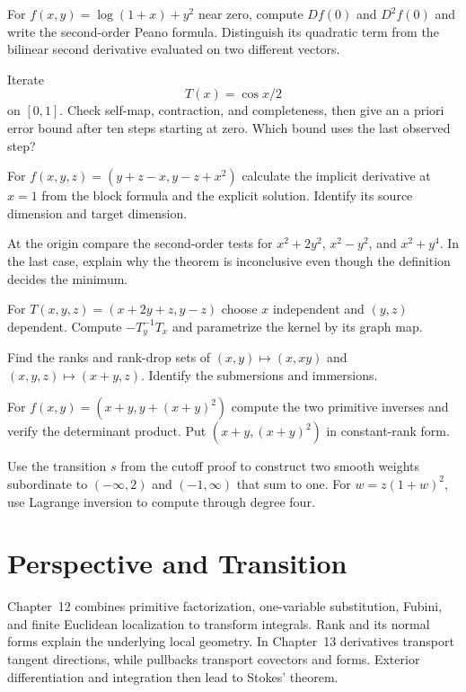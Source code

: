\begin{exercise}
For $f(x,y)=\log(1+x)+y^2$ near zero, compute $Df(0)$ and $D^2f(0)$ and write
the second-order Peano formula. Distinguish its quadratic term from the
bilinear second derivative evaluated on two different vectors.
\end{exercise}
\begin{exercise}
Iterate
\[
T(x)=\cos x/2
\]
 on $[0,1]$. Check self-map, contraction,
and completeness, then give an a priori error bound after ten steps
starting at zero. Which bound uses the last observed step?
\end{exercise}
\begin{exercise}
For $f(x,y,z)=(y+z-x,y-z+x^2)$ calculate the implicit derivative at
$x=1$ from the block formula and the explicit solution. Identify its
source dimension and target dimension.
\end{exercise}
\begin{exercise}
At the origin compare the second-order tests for $x^2+2y^2$,
$x^2-y^2$, and $x^2+y^4$. In the last case, explain why the theorem
is inconclusive even though the definition decides the minimum.
\end{exercise}

\begin{exercise}
For $T(x,y,z)=(x+2y+z,y-z)$ choose $x$ independent and $(y,z)$ dependent.
Compute $-T_y^{-1}T_x$ and parametrize the kernel by its graph map.
\end{exercise}
\begin{exercise}
Find the ranks and rank-drop sets of $(x,y)\mapsto(x,xy)$ and
$(x,y,z)\mapsto(x+y,z)$. Identify the submersions and immersions.
\end{exercise}
\begin{exercise}
For $f(x,y)=(x+y,y+(x+y)^2)$ compute the two primitive inverses and
verify the determinant product. Put $(x+y,(x+y)^2)$ in constant-rank form.
\end{exercise}
\begin{exercise}
Use the transition $s$ from the cutoff proof to construct two smooth
weights subordinate to $(-\infty,2)$ and $(-1,\infty)$ that sum to one.
For $w=z(1+w)^2$, use Lagrange inversion to compute through degree four.
\end{exercise}

\section{Perspective and Transition}

Chapter~12 combines primitive factorization, one-variable substitution,
Fubini, and finite Euclidean localization to transform integrals.
Rank and its normal forms explain the underlying local geometry. In Chapter~13 derivatives transport tangent
directions, while pullbacks transport covectors and forms. Exterior
differentiation and integration then lead to Stokes' theorem.
